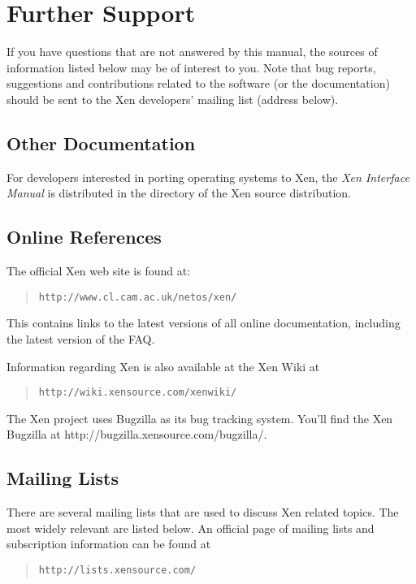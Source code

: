 \chapter{Further Support}

If you have questions that are not answered by this manual, the
sources of information listed below may be of interest to you.  Note
that bug reports, suggestions and contributions related to the
software (or the documentation) should be sent to the Xen developers'
mailing list (address below).


\section{Other Documentation}

For developers interested in porting operating systems to Xen, the
\emph{Xen Interface Manual} is distributed in the 
directory of the Xen source distribution.


\section{Online References}

The official Xen web site is found at:
\begin{quote} {\tt http://www.cl.cam.ac.uk/netos/xen/}
\end{quote}

This contains links to the latest versions of all online
documentation, including the latest version of the FAQ.

Information regarding Xen is also available at the Xen Wiki at
\begin{quote} {\tt http://wiki.xensource.com/xenwiki/}\end{quote}
The Xen project uses Bugzilla as its bug tracking system. You'll find
the Xen Bugzilla at http://bugzilla.xensource.com/bugzilla/.


\section{Mailing Lists}

There are several mailing lists that are used to discuss Xen related
topics. The most widely relevant are listed below. An official page of
mailing lists and subscription information can be found at \begin{quote}
  {\tt http://lists.xensource.com/} \end{quote}

